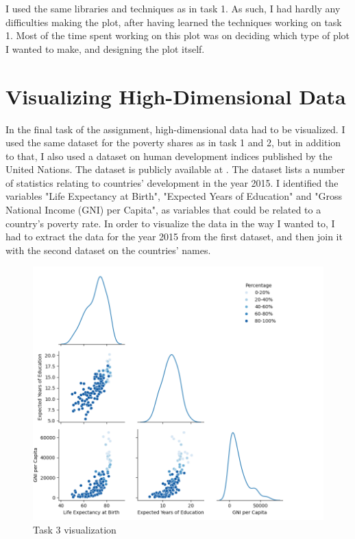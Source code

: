 \documentclass[11pt,a4paper,titlepage]{article}
\begin{document}
I used the same libraries and techniques as in task 1. As such, I had hardly any difficulties making the plot, after having learned the techniques working on task 1. Most of the time spent working on this plot was on deciding which type of plot I wanted to make, and designing the plot itself.

\section{Visualizing High-Dimensional Data}

In the final task of the assignment, high-dimensional data had to be visualized. I used the same dataset for the poverty shares as in task 1 and 2, but in addition to that, I also used a dataset on human development indices published by the United Nations. The dataset is publicly available at \cite{data2}. The dataset lists a number of statistics relating to countries' development in the year 2015. I identified the variables "Life Expectancy at Birth", "Expected Years of Education" and "Gross National Income (GNI) per Capita", as variables that could be related to a country's poverty rate. In order to visualize the data in the way I wanted to, I had to extract the data for the year 2015 from the first dataset, and then join it with the second dataset on the countries' names.

\begin{figure}[h!]
    \centering
    \includegraphics[width=1.0\linewidth]{reports/assignment-2/imgs/task3.png}
    \caption{Task 3 visualization}
    \label{fig:viz3}
\end{figure}
\end{document}
